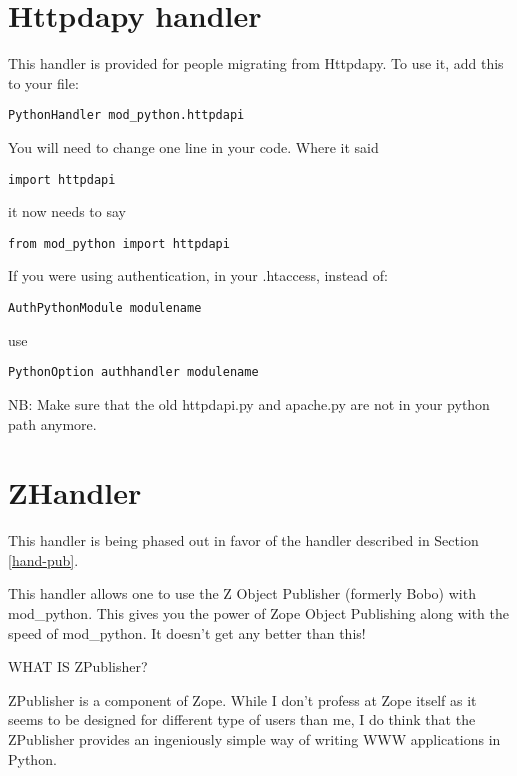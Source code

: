 \section{Httpdapy handler\label{hand-httpdapy}}

This handler is provided for people migrating from Httpdapy. To use
it, add this to your  file:

\begin{verbatim}
PythonHandler mod_python.httpdapi
\end{verbatim}

You will need to change one line in your code. Where it said

\begin{verbatim}
import httpdapi
\end{verbatim}

it now needs to say

\begin{verbatim}
from mod_python import httpdapi
\end{verbatim}    

If you were using authentication, in your .htaccess, instead of:

\begin{verbatim}
AuthPythonModule modulename
\end{verbatim}    

use
\begin{verbatim}
PythonOption authhandler modulename
\end{verbatim}    

NB: Make sure that the old httpdapi.py and apache.py are not in your
python path anymore.

\section{ZHandler\label{hand-z}}

 This handler is being phased out in favor of the
 handler described in 
Section \ref{hand-pub}.

This handler allows one to use the Z Object Publisher (formerly Bobo)
with mod_python. This gives you the power of Zope Object Publishing
along with the speed of mod_python. It doesn't get any better than
this!

WHAT IS ZPublisher?

ZPublisher is a component of Zope. While I don't profess at Zope
itself as it seems to be designed for different type of users than me,
I do think that the ZPublisher provides an ingeniously simple way of
writing WWW applications in Python.

